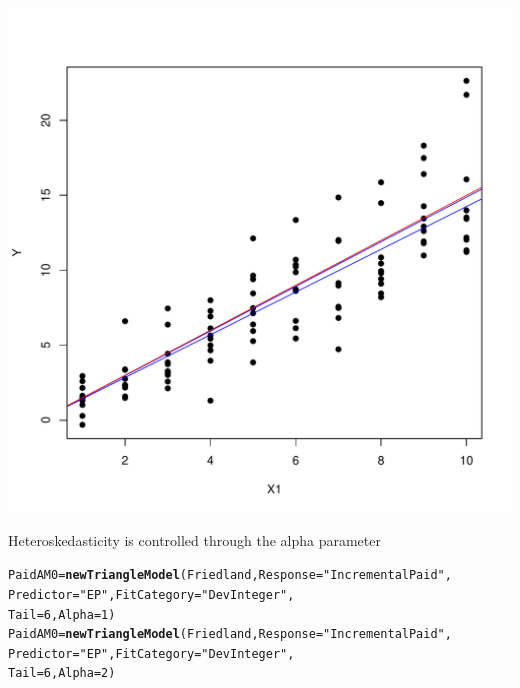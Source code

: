\documentclass[xcolor=dvipsnames]{beamer}\usepackage{graphicx, color}
\makeatletter
\def\maxwidth{ %
  \ifdim\Gin@nat@width>\linewidth
    \linewidth
  \else
    \Gin@nat@width
  \fi
}
\newcommand{\hlfunctioncall}[1]{\textcolor[rgb]{0.501960784313725,0,0.329411764705882}{\textbf{#1}}}%
\newcommand{\hlstring}[1]{\textcolor[rgb]{0.6,0.6,1}{#1}}%
\newenvironment{kframe}{%
 \def\at@end@of@kframe{}%
 \ifinner\ifhmode%
  \def\at@end@of@kframe{\end{minipage}}%
  \begin{minipage}{\columnwidth}%
 \fi\fi%
 \def\FrameCommand##1{\hskip\@totalleftmargin \hskip-\fboxsep
 \colorbox{shadecolor}{##1}\hskip-\fboxsep
     \hskip-\linewidth \hskip-\@totalleftmargin \hskip\columnwidth}%
 \MakeFramed {\advance\hsize-\width
   \@totalleftmargin\z@ \linewidth\hsize
   \@setminipage}}%
 {\par\unskip\endMakeFramed%
 \at@end@of@kframe}
\newenvironment{knitrout}{}{} %
\makeatother
\begin{document}
\begin{frame}[fragile]
\begin{knitrout}
\color{fgcolor}
\includegraphics[width=\maxwidth]{figure/unnamed-chunk-8} 

\end{knitrout}

\end{frame}

\begin{frame}[fragile]{Heteroskedasticity is controlled through the alpha parameter}
\begin{knitrout}
\color{fgcolor}\begin{kframe}
\begin{alltt}
PaidAM0 = \hlfunctioncall{newTriangleModel}(Friedland, Response = \hlstring{"IncrementalPaid"}, 
    Predictor = \hlstring{"EP"}, FitCategory = \hlstring{"DevInteger"}, 
    Tail = 6, Alpha = 1)
PaidAM0 = \hlfunctioncall{newTriangleModel}(Friedland, Response = \hlstring{"IncrementalPaid"}, 
    Predictor = \hlstring{"EP"}, FitCategory = \hlstring{"DevInteger"}, 
    Tail = 6, Alpha = 2)
\end{alltt}
\end{kframe}
\end{knitrout}

\end{frame}
\end{document}
